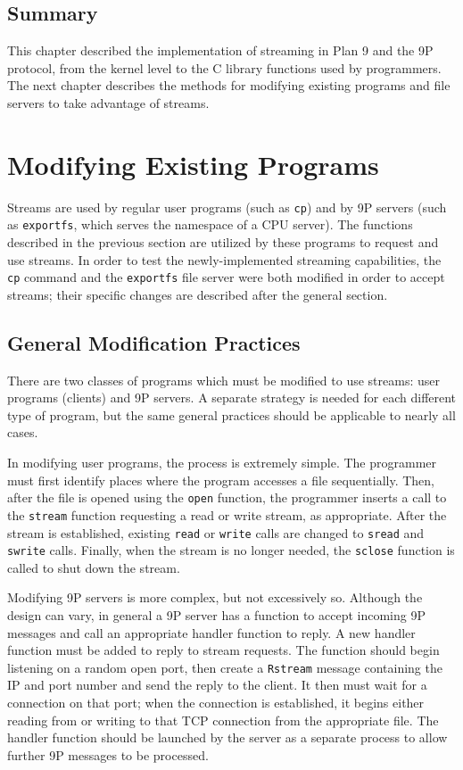 \documentclass[11pt,american]{report}
\begin{document}
\section{Summary}

This chapter described the implementation of streaming in Plan 9 and the 9P protocol, from the kernel level to the C library functions used by programmers. The next chapter describes the methods for modifying existing programs and file servers to take advantage of streams.

\chapter{Modifying Existing Programs}

Streams are used by regular user programs (such as {\tt cp}) and by 9P servers (such as {\tt exportfs}, which serves the namespace of a CPU server). The functions described in the previous section are utilized by these programs to request and use streams. In order to test the newly-implemented streaming capabilities, the {\tt cp} command and the {\tt exportfs} file server were both modified in order to accept streams; their specific changes are described after the general section.

\section{General Modification Practices}

There are two classes of programs which must be modified to use streams: user programs (clients) and 9P servers. A separate strategy is needed for each different type of program, but the same general practices should be applicable to nearly all cases.

In modifying user programs, the process is extremely simple. The programmer must first identify places where the program accesses a file sequentially. Then, after the file is opened using the {\tt open} function, the programmer inserts a call to the {\tt stream} function requesting a read or write stream, as appropriate. After the stream is established, existing {\tt read} or {\tt write} calls are changed to {\tt sread} and {\tt swrite} calls. Finally, when the stream is no longer needed, the {\tt sclose} function is called to shut down the stream.

Modifying 9P servers is more complex, but not excessively so. Although the design can vary, in general a 9P server has a function to accept incoming 9P messages and call an appropriate handler function to reply. A new handler function must be added to reply to stream requests. The function should begin listening on a random open port, then create a {\tt Rstream} message containing the IP and port number and send the reply to the client. It then must wait for a connection on that port; when the connection is established, it begins either reading from or writing to that TCP connection from the appropriate file. The handler function should be launched by the server as a separate process to allow further 9P messages to be processed.
\end{document}
